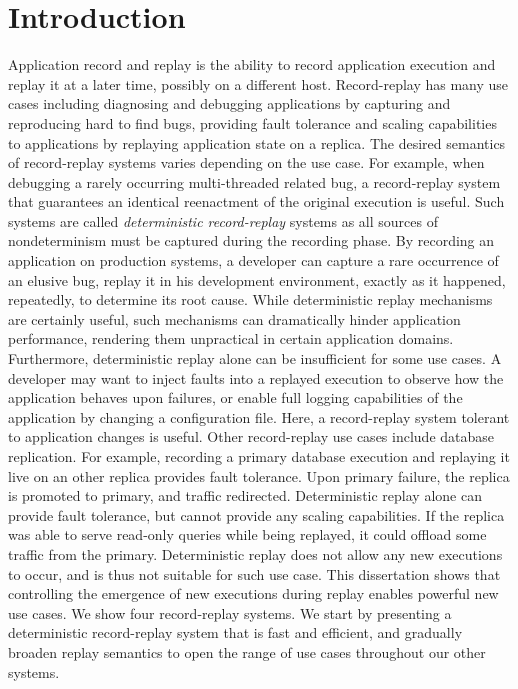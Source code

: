 \chapter{Introduction}
\label{ch:intro}

Application record and replay is the ability to record application execution and
replay it at a later time, possibly on a different host. Record-replay has many
use cases including diagnosing and debugging applications by capturing and
reproducing hard to find bugs, providing fault tolerance and scaling
capabilities to applications by replaying application state on a replica.
The desired semantics of record-replay systems varies depending on the use case.
For example, when debugging a rarely occurring multi-threaded related bug,
a record-replay system that guarantees an identical reenactment of the original
execution is useful. Such systems are called {\em deterministic record-replay}
systems as all sources of nondeterminism must be captured during the recording
phase.
By recording an application on production
systems, a developer can capture a rare occurrence of an elusive bug, replay it
in his development environment, exactly as it happened, repeatedly, to
determine its root cause.
While deterministic replay mechanisms are certainly useful, such mechanisms
can dramatically hinder application performance, rendering them
unpractical in certain application domains. Furthermore, deterministic replay alone
can be insufficient for some use cases. A developer may want to inject faults
into a replayed execution to observe how the application behaves upon failures, or
enable full logging capabilities of the application by changing a configuration
file. Here, a record-replay system tolerant to application changes is useful.
Other record-replay use cases include database replication. For example,
recording a primary database execution and replaying it live on an other
replica provides fault tolerance. Upon primary failure, the replica is
promoted to primary, and traffic redirected. Deterministic replay alone can
provide fault tolerance, but cannot provide any scaling capabilities.
If the replica was able to serve read-only queries while being replayed,
it could offload some traffic from the primary. Deterministic replay does
not allow any new executions to occur, and is thus not suitable for such use case.
This dissertation shows that controlling the emergence of new executions during
replay enables powerful new use cases.
We show four record-replay systems. We start by presenting a deterministic
record-replay system that is fast and efficient, and gradually broaden
replay semantics to open the range of use cases throughout our other systems.

